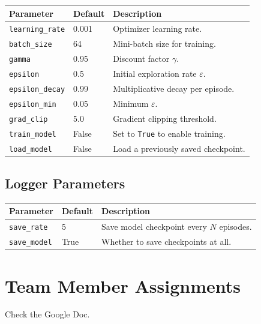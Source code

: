 \documentclass[11pt,a4paper]{article}
\begin{document}
\begin{center}
\begin{longtable}{llp{7cm}}
\toprule
\textbf{Parameter} & \textbf{Default} & \textbf{Description} \\
\midrule
\endhead
\texttt{learning\_rate}   & 0.001 & Optimizer learning rate. \\
\texttt{batch\_size}      & 64    & Mini-batch size for training. \\
\texttt{gamma}            & 0.95  & Discount factor $\gamma$. \\
\texttt{epsilon}          & 0.5   & Initial exploration rate $\varepsilon$. \\
\texttt{epsilon\_decay}   & 0.99  & Multiplicative decay per episode. \\
\texttt{epsilon\_min}     & 0.05  & Minimum $\varepsilon$. \\
\texttt{grad\_clip}       & 5.0   & Gradient clipping threshold. \\
\texttt{train\_model}     & False & Set to \texttt{True} to enable training. \\
\texttt{load\_model}      & False & Load a previously saved checkpoint. \\
\bottomrule
\end{longtable}
\end{center}

\subsection{Logger Parameters}

\begin{center}
\begin{longtable}{llp{7cm}}
\toprule
\textbf{Parameter} & \textbf{Default} & \textbf{Description} \\
\midrule
\endhead
\texttt{save\_rate}  & 5    & Save model checkpoint every $N$ episodes. \\
\texttt{save\_model} & True & Whether to save checkpoints at all. \\
\bottomrule
\end{longtable}
\end{center}

\section{Team Member Assignments}

Check the Google Doc.
\end{document}
